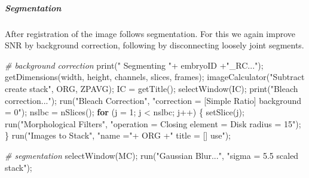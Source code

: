 \documentclass[10pt, b5paper, singlespacinge, twoside]{reedthesis} %
\newenvironment{Shaded}{}{}
\newcommand{\AttributeTok}[1]{#1}
\newcommand{\CommentTok}[1]{\textit{#1}}
\newcommand{\ControlFlowTok}[1]{\textbf{#1}}
\newcommand{\DecValTok}[1]{#1}
\newcommand{\FunctionTok}[1]{#1}
\newcommand{\NormalTok}[1]{#1}
\newcommand{\OtherTok}[1]{#1}
\newcommand{\SpecialCharTok}[1]{#1}
\newcommand{\StringTok}[1]{#1}
\theoremstyle{definition}
\theoremstyle{definition}
\theoremstyle{definition}
\theoremstyle{remark}
\begin{document}
\hypertarget{segmentation-1}{%
\subparagraph{Segmentation}\label{segmentation-1}}

After registration of the image follows segmentation. For this we again improve SNR by background correction, following by disconnecting loosely joint segments.

\scriptsize
\begin{Shaded}
\begin{Highlighting}[numbers=left,,]
\CommentTok{\#  background correction}
    \FunctionTok{print}\NormalTok{(}\StringTok{"  Segmenting "}\SpecialCharTok{+}\NormalTok{ embryoID }\SpecialCharTok{+}\StringTok{"\_RC..."}\NormalTok{);}
        \FunctionTok{getDimensions}\NormalTok{(width, height, channels, slices, frames);}
        \FunctionTok{imageCalculator}\NormalTok{(}\StringTok{"Subtract create stack"}\NormalTok{, ORG, ZPAVG);}
\NormalTok{        IC }\OtherTok{=} \FunctionTok{getTitle}\NormalTok{();}
    \FunctionTok{selectWindow}\NormalTok{(IC);}
        \FunctionTok{print}\NormalTok{(}\StringTok{"Bleach correction..."}\NormalTok{);}
        \FunctionTok{run}\NormalTok{(}\StringTok{"Bleach Correction"}\NormalTok{, }
            \StringTok{"correction = [Simple Ratio] background = 0"}\NormalTok{);}
\NormalTok{        nslbc }\OtherTok{=} \FunctionTok{nSlices}\NormalTok{();}
        \ControlFlowTok{for}\NormalTok{ (}\AttributeTok{j =} \DecValTok{1}\NormalTok{; j }\SpecialCharTok{\textless{}}\NormalTok{ nslbc; j}\SpecialCharTok{++}\NormalTok{) \{}
            \FunctionTok{setSlice}\NormalTok{(j);}
            \FunctionTok{run}\NormalTok{(}\StringTok{"Morphological Filters"}\NormalTok{,}
                \StringTok{"operation = Closing element = Disk radius = 15"}\NormalTok{);}
\NormalTok{        \}}
        \FunctionTok{run}\NormalTok{(}\StringTok{"Images to Stack"}\NormalTok{, }\StringTok{"name ="}\SpecialCharTok{+}\NormalTok{ ORG }\SpecialCharTok{+}\StringTok{" title = [] use"}\NormalTok{);}
        
    \CommentTok{\#   segmentation}
        \FunctionTok{selectWindow}\NormalTok{(MC);}
        \FunctionTok{run}\NormalTok{(}\StringTok{"Gaussian Blur..."}\NormalTok{, }\StringTok{"sigma = 5.5 scaled stack"}\NormalTok{);}
        

\end{Highlighting}
\end{Shaded}
\end{document}
